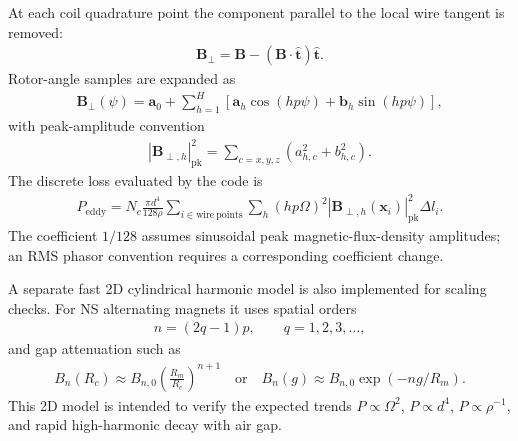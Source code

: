 \documentclass[a4paper, 11pt]{article}
\begin{document}
At each coil quadrature point the component parallel to the local wire tangent is removed:
\begin{align}
    \mathbf{B}_{\perp}=\mathbf{B}-(\mathbf{B}\cdot\hat{\mathbf t})\hat{\mathbf t}.
\end{align}
Rotor-angle samples are expanded as
\begin{align}
    \mathbf{B}_{\perp}(\psi)=\mathbf{a}_0+
    \sum_{h=1}^{H}\left[\mathbf{a}_h\cos(hp\psi)+\mathbf{b}_h\sin(hp\psi)\right],
\end{align}
with peak-amplitude convention
\begin{align}
    |\mathbf{B}_{\perp,h}|_{\mathrm{pk}}^2=
    \sum_{c=x,y,z}(a_{h,c}^2+b_{h,c}^2).
\end{align}
The discrete loss evaluated by the code is
\begin{align}
    P_{\mathrm{eddy}}=
    N_c\frac{\pi d^4}{128\rho}
    \sum_{i\in\mathrm{wire\ points}}\sum_h
    (hp\Omega)^2 |\mathbf{B}_{\perp,h}(\mathbf{x}_i)|_{\mathrm{pk}}^2\Delta l_i .
\end{align}
The coefficient $1/128$ assumes sinusoidal peak magnetic-flux-density amplitudes; an RMS phasor convention requires a corresponding coefficient change.

A separate fast 2D cylindrical harmonic model is also implemented for scaling checks.  For NS alternating magnets it uses spatial orders
\begin{align}
    n=(2q-1)p, \qquad q=1,2,3,\ldots,
\end{align}
and gap attenuation such as
\begin{align}
    B_n(R_c)\approx B_{n,0}\left(\frac{R_m}{R_c}\right)^{n+1}
    \quad\mathrm{or}\quad
    B_n(g)\approx B_{n,0}\exp(-n g/R_m).
\end{align}
This 2D model is intended to verify the expected trends $P\propto\Omega^2$, $P\propto d^4$, $P\propto\rho^{-1}$, and rapid high-harmonic decay with air gap.
\end{document}
